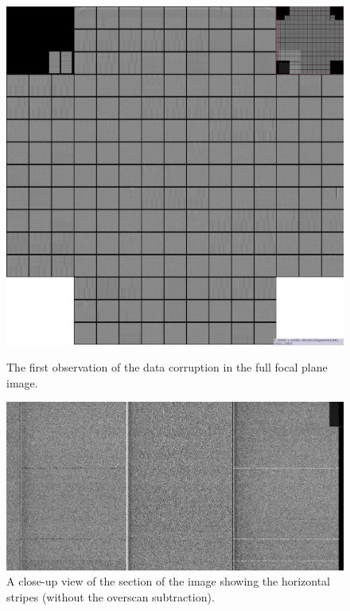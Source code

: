 \begin{figure}
    \centering
    \begin{minipage}{0.49\linewidth}
        \centering
        \includegraphics[width=\linewidth]{figures/Issues/FirstObservationofCorruption.png}
        \caption{The first observation of the data corruption in the full focal plane image.}
        \label{fig:thefirstobservationofdatacorruption}
    \end{minipage}
    \hfill
    \begin{minipage}{0.49\linewidth}
        \centering
        \includegraphics[width=\linewidth]{figures/Issues/horizontalstripes.png}
        \caption{A close-up view of the section of the image showing the horizontal stripes (without the overscan subtraction).}
        \label{fig:horizontal-stripes}
    \end{minipage}
\end{figure}


